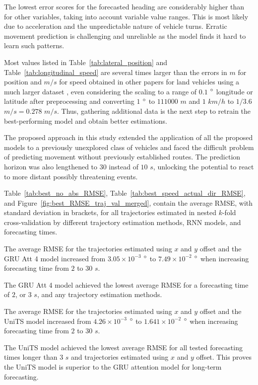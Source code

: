 \documentclass[preprint,12pt]{elsarticle}
\begin{document}
The lowest error scores for the forecasted heading are considerably higher than for other variables, taking into account variable value ranges. This is most likely due to acceleration and the unpredictable nature of vehicle turns. Erratic movement prediction is challenging and unreliable as the model finds it hard to learn such patterns.

Most values listed in Table~\ref{tab:lateral_position} and Table~\ref{tab:longitudinal_speed} are several times larger than the errors in $m$ for position and $m/s$ for speed obtained in other papers for land vehicles using a much larger dataset \cite{altche2017lstm, liu2014vehicle}, even considering the scaling to a range of $0.1$ $\degree$ longitude or latitude after preprocessing and converting $1$ $\degree$ to $111000$ $m$ and $1$ $km/h$ to $1 / 3.6$ $m/s = 0.278$ $m/s$. Thus, gathering additional data is the next step to retrain the best-performing model and obtain better estimations.

The proposed approach in this study extended the application of all the proposed models to a previously unexplored class of vehicles and faced the difficult problem of predicting movement without previously established routes. The prediction horizon was also lengthened to $30$ instead of $10$ $s$, unlocking the potential to react to more distant possibly threatening events.

Table~\ref{tab:best_no_abs_RMSE}, Table~\ref{tab:best_speed_actual_dir_RMSE}, and Figure~\ref{fig:best_RMSE_traj_val_merged}, contain the average RMSE, with standard deviation in brackets, for all trajectories estimated in nested $k$-fold cross-validation by different trajectory estimation methods, RNN models, and forecasting times.

The average RMSE for the trajectories estimated using $x$ and $y$ offset and the GRU Att 4 model increased from $3.05 \times 10^{-3}$ $\degree$ to $7.49 \times 10^{-2}$ $\degree$ when increasing forecasting time from $2$ to $30$ $s$.

The GRU Att 4 model achieved the lowest average RMSE for a forecasting time of $2$, or $3$ $s$, and any trajectory estimation methods.

The average RMSE for the trajectories estimated using $x$ and $y$ offset and the UniTS model increased from $4.26 \times 10^{-3}$ $\degree$ to $1.641 \times 10^{-2}$ $\degree$ when increasing forecasting time from $2$ to $30$ $s$.

The UniTS model achieved the lowest average RMSE for all tested forecasting times longer than $3$ $s$ and trajectories estimated using $x$ and $y$ offset. This proves the UniTS model is superior to the GRU attention model for long-term forecasting.
\end{document}
